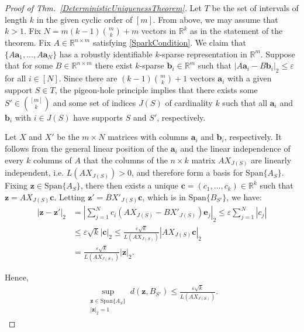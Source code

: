 \documentclass[journal, twocolumn]{IEEEtran}
\begin{document}
\begin{proof}[Proof of Thm.~\ref{DeterministicUniquenessTheorem}]
Let $T$ be the set of intervals of length $k$ in the given cyclic order of $[m]$. From above, we may assume that $k > 1$. Fix $N = m(k-1){m \choose k}+m$ vectors in $\mathbb{R}^k$ as in the statement of the theorem. Fix $A \in \mathbb{R}^{n \times m}$ satisfying \eqref{SparkCondition}. We claim that $\{A\mathbf{a}_1, \ldots, A\mathbf{a}_N\}$ has a robustly identifiable $k$-sparse representation in $\mathbb{R}^m$. Suppose that for some $B \in \mathbb{R}^{n \times m}$ there exist $k$-sparse $\mathbf{b}_i \in \mathbb{R}^m$ such that $|A\mathbf{a}_i - B\mathbf{b}_i|_2 \leq \varepsilon$ for all $i \in [N]$. Since there are $(k-1){m \choose k}+1$ vectors $\mathbf{a}_i$ with a given support $S \in T$, the pigeon-hole principle implies that there exists some $S' \in {[m] \choose k}$ and some set of indices $J(S)$ of cardinality $k$ such that all $\mathbf{a}_i$ and $\mathbf{b}_i$ with $i \in J(S)$ have supports $S$ and $S'$, respectively.

Let $X$ and $X'$ be the $m \times N$ matrices with columns $\mathbf{a}_i$ and $\mathbf{b}_i$, respectively. It follows from the general linear position of the $\mathbf{a}_i$ and the linear independence of every $k$ columns of $A$ that the columns of the $n \times k$ matrix $AX_{J(S)}$ are linearly independent, i.e. $L(AX_{J(S)}) > 0$, and therefore form a basis for $\text{Span}\{A_{S}\}$. Fixing $\mathbf{z} \in \text{Span}\{A_{S}\}$, there then exists a unique $\mathbf{c} = (c_1, \ldots, c_k) \in \mathbb{R}^k$ such that $\mathbf{z} = AX_{J(S)}\mathbf{c}$. Letting $\mathbf{z'} = BX'_{J(S)}\mathbf{c}$, which is in $\text{Span}\{B_{S'}\}$, we have:
\begin{align*}
|\mathbf{z} - \mathbf{z'}|_2 
&= |\sum_{j=1}^N c_i(AX_{J(S)} - BX'_{J(S)})\mathbf{e}_j|_2 
\leq \varepsilon \sum_{j=1}^N |c_j| \\
&\leq \varepsilon \sqrt{k}  |\mathbf{c}|_2 
\leq \frac{\varepsilon \sqrt{k}}{L(AX_{J(S)})} |AX_{J(S)}\mathbf{c}|_2 \\
&= \frac{\varepsilon \sqrt{k}}{L(AX_{J(S)})} |\mathbf{z}|_2.
\end{align*}

Hence,
\begin{align}\label{ABSubspaceDistance}
\sup_{ \substack{ \mathbf{z} \in \text{Span}\{A_{S}\} \\ |\mathbf{z}|_2 = 1} } d(\mathbf{z}, B_{S'}) \leq \frac{\varepsilon\sqrt{k}}{L(AX_{J(S)})}.
\end{align}


\end{proof}
\end{document}

